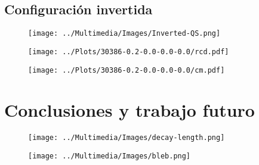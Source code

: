 \documentclass{beamer}
\begin{document}
\subsection{Configuración invertida}

\begin{frame}
    \begin{figure}
        \centering
        \texttt{[image: ../Multimedia/Images/Inverted-QS.png]}
    \end{figure}
\end{frame}

\begin{frame}
    \begin{figure}
        \centering
        \texttt{[image: ../Plots/30386-0.2-0.0-0.0-0.0/rcd.pdf]}
    \end{figure}
\end{frame}

\begin{frame}
    \begin{figure}
        \centering
        \texttt{[image: ../Plots/30386-0.2-0.0-0.0-0.0/cm.pdf]}
    \end{figure}
\end{frame}

\section{Conclusiones y trabajo futuro}

\begin{frame}
    \begin{figure}
        \centering
        \texttt{[image: ../Multimedia/Images/decay-length.png]}
    \end{figure}
\end{frame}

\begin{frame}
    \begin{figure}
        \centering
        \texttt{[image: ../Multimedia/Images/bleb.png]}
    \end{figure}
\end{frame}
\end{document}
